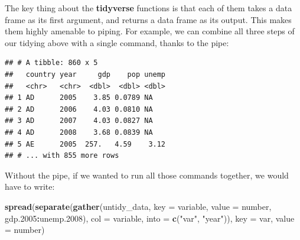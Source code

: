 \documentclass[12pt,oneside,openany]{book}
\newenvironment{Shaded}{\begin{snugshade}}{\end{snugshade}}
\newcommand{\KeywordTok}[1]{\textcolor[rgb]{0.13,0.29,0.53}{\textbf{#1}}}
\newcommand{\DataTypeTok}[1]{\textcolor[rgb]{0.13,0.29,0.53}{#1}}
\newcommand{\FloatTok}[1]{\textcolor[rgb]{0.00,0.00,0.81}{#1}}
\newcommand{\StringTok}[1]{\textcolor[rgb]{0.31,0.60,0.02}{#1}}
\newcommand{\OperatorTok}[1]{\textcolor[rgb]{0.81,0.36,0.00}{\textbf{#1}}}
\newcommand{\NormalTok}[1]{#1}
\begin{document}
The key thing about the \textbf{tidyverse} functions is that each of
them takes a data frame as its first argument, and returns a data frame
as its output. This makes them highly amenable to piping. For example,
we can combine all three steps of our tidying above with a single
command, thanks to the pipe:

\begin{Shaded}
\end{Shaded}

\begin{verbatim}
## # A tibble: 860 x 5
##   country year     gdp    pop unemp
##   <chr>   <chr>  <dbl>  <dbl> <dbl>
## 1 AD      2005    3.85 0.0789 NA   
## 2 AD      2006    4.03 0.0810 NA   
## 3 AD      2007    4.03 0.0827 NA   
## 4 AD      2008    3.68 0.0839 NA   
## 5 AE      2005  257.   4.59    3.12
## # ... with 855 more rows
\end{verbatim}

Without the pipe, if we wanted to run all those commands together, we
would have to write:

\begin{Shaded}
\begin{Highlighting}[]
\KeywordTok{spread}\NormalTok{(}\KeywordTok{separate}\NormalTok{(}\KeywordTok{gather}\NormalTok{(untidy_data,}
                       \DataTypeTok{key =}\NormalTok{ variable,}
                       \DataTypeTok{value =}\NormalTok{ number,}
\NormalTok{                       gdp}\FloatTok{.2005}\OperatorTok{:}\NormalTok{unemp}\FloatTok{.2008}\NormalTok{),}
                \DataTypeTok{col =}\NormalTok{ variable,}
                \DataTypeTok{into =} \KeywordTok{c}\NormalTok{(}\StringTok{"var"}\NormalTok{, }\StringTok{"year"}\NormalTok{)),}
       \DataTypeTok{key =}\NormalTok{ var,}
       \DataTypeTok{value =}\NormalTok{ number)}
\end{Highlighting}
\end{Shaded}
\end{document}
